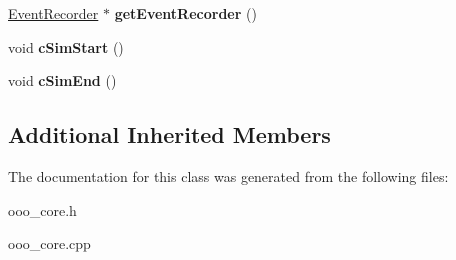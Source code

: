 \begin{DoxyCompactItemize}
\item 
\hypertarget{classOOOCore_ab70925f444691d37172dd593df14d7de}{\hyperlink{classEventRecorder}{Event\-Recorder} $\ast$ {\bfseries get\-Event\-Recorder} ()}\label{classOOOCore_ab70925f444691d37172dd593df14d7de}

\item 
\hypertarget{classOOOCore_a005b405bed0f1f23b419be5cdff68736}{void {\bfseries c\-Sim\-Start} ()}\label{classOOOCore_a005b405bed0f1f23b419be5cdff68736}

\item 
\hypertarget{classOOOCore_a7aee253f36e45cf018589efa8e2c98b2}{void {\bfseries c\-Sim\-End} ()}\label{classOOOCore_a7aee253f36e45cf018589efa8e2c98b2}

\end{DoxyCompactItemize}
\subsection*{Additional Inherited Members}


The documentation for this class was generated from the following files\-:\begin{DoxyCompactItemize}
\item 
ooo\-\_\-core.\-h\item 
ooo\-\_\-core.\-cpp\end{DoxyCompactItemize}
